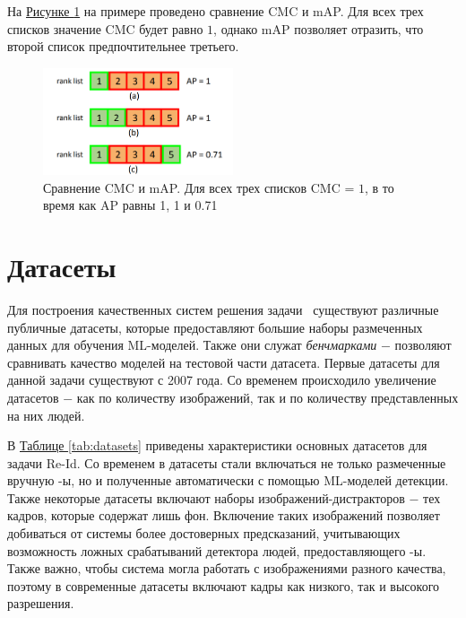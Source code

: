 На \hyperref[fig:cmc_map]{Рисунке \ref*{fig:cmc_map}} на примере проведено сравнение CMC и mAP. Для всех трех списков значение CMC будет равно $1$, однако mAP позволяет отразить, что второй список предпочтительнее третьего.

\begin{figure}[ht]
    \centering
    \includegraphics[width=0.5\textwidth]{images/reid_problem/metrics_example.png}
    \caption{Сравнение CMC и mAP. Для всех трех списков CMC = $1$, в то время как AP равны 1, 1 и 0.71 \cite{zheng2015scalable}}
    \label{fig:cmc_map}
\end{figure}

\section{Датасеты}

Для построения качественных систем решения задачи \reid\ существуют различные публичные датасеты, которые предоставляют большие наборы размеченных данных для обучения ML-моделей. Также они служат \textit{бенчмарками} $-$ позволяют сравнивать качество моделей на тестовой части датасета. Первые датасеты для данной задачи существуют с 2007 года. Со временем происходило увеличение датасетов $-$ как по количеству изображений, так и по количеству представленных на них людей. 

В \hyperref[tab:datasets]{Таблице \ref*{tab:datasets}} приведены характеристики основных датасетов для задачи Re-Id. Со временем в датасеты стали включаться не только размеченные вручную \bbox-ы, но и полученные автоматически с помощью ML-моделей детекции. Также некоторые датасеты включают наборы изображений-дистракторов $-$ тех кадров, которые содержат лишь фон. Включение таких изображений позволяет добиваться от системы более достоверных предсказаний, учитывающих возможность ложных срабатываний детектора людей, предоставляющего \bbox-ы. Также важно, чтобы система могла работать с изображениями разного качества, поэтому в современные датасеты включают кадры как низкого, так и высокого разрешения.

